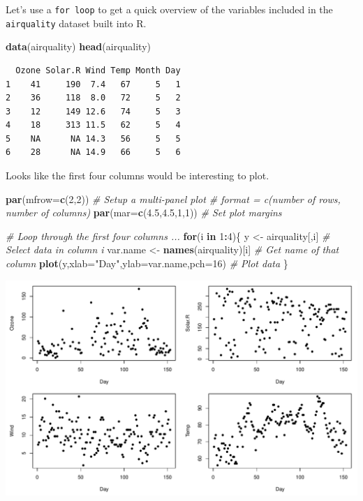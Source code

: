 \documentclass[
]{book}
\newenvironment{Shaded}{\begin{snugshade}}{\end{snugshade}}
\newcommand{\CommentTok}[1]{\textcolor[rgb]{0.56,0.35,0.01}{\textit{#1}}}
\newcommand{\ControlFlowTok}[1]{\textcolor[rgb]{0.13,0.29,0.53}{\textbf{#1}}}
\newcommand{\DataTypeTok}[1]{\textcolor[rgb]{0.13,0.29,0.53}{#1}}
\newcommand{\DecValTok}[1]{\textcolor[rgb]{0.00,0.00,0.81}{#1}}
\newcommand{\FloatTok}[1]{\textcolor[rgb]{0.00,0.00,0.81}{#1}}
\newcommand{\KeywordTok}[1]{\textcolor[rgb]{0.13,0.29,0.53}{\textbf{#1}}}
\newcommand{\NormalTok}[1]{#1}
\newcommand{\OperatorTok}[1]{\textcolor[rgb]{0.81,0.36,0.00}{\textbf{#1}}}
\newcommand{\StringTok}[1]{\textcolor[rgb]{0.31,0.60,0.02}{#1}}
\begin{document}
Let's use a \texttt{for\ loop} to get a quick overview of the variables included in the \texttt{airquality} dataset built into R.

\begin{Shaded}
\begin{Highlighting}[]
\KeywordTok{data}\NormalTok{(airquality)}
\KeywordTok{head}\NormalTok{(airquality)}
\end{Highlighting}
\end{Shaded}

\begin{verbatim}
  Ozone Solar.R Wind Temp Month Day
1    41     190  7.4   67     5   1
2    36     118  8.0   72     5   2
3    12     149 12.6   74     5   3
4    18     313 11.5   62     5   4
5    NA      NA 14.3   56     5   5
6    28      NA 14.9   66     5   6
\end{verbatim}

Looks like the first four columns would be interesting to plot.

\begin{Shaded}
\begin{Highlighting}[]
\KeywordTok{par}\NormalTok{(}\DataTypeTok{mfrow=}\KeywordTok{c}\NormalTok{(}\DecValTok{2}\NormalTok{,}\DecValTok{2}\NormalTok{)) }\CommentTok{# Setup a multi-panel plot # format = c(number of rows, number of columns)}
\KeywordTok{par}\NormalTok{(}\DataTypeTok{mar=}\KeywordTok{c}\NormalTok{(}\FloatTok{4.5}\NormalTok{,}\FloatTok{4.5}\NormalTok{,}\DecValTok{1}\NormalTok{,}\DecValTok{1}\NormalTok{)) }\CommentTok{# Set plot margins}

\CommentTok{# Loop through the first four columns ...}
\ControlFlowTok{for}\NormalTok{(i }\ControlFlowTok{in} \DecValTok{1}\OperatorTok{:}\DecValTok{4}\NormalTok{)\{}
\NormalTok{  y <-}\StringTok{ }\NormalTok{airquality[,i] }\CommentTok{# Select data in column i}
\NormalTok{  var.name <-}\StringTok{ }\KeywordTok{names}\NormalTok{(airquality)[i] }\CommentTok{# Get name of that column}
  \KeywordTok{plot}\NormalTok{(y,}\DataTypeTok{xlab=}\StringTok{"Day"}\NormalTok{,}\DataTypeTok{ylab=}\NormalTok{var.name,}\DataTypeTok{pch=}\DecValTok{16}\NormalTok{) }\CommentTok{# Plot data}
\NormalTok{\}}
\end{Highlighting}
\end{Shaded}

\includegraphics{figures/unnamed-chunk-229-1.pdf}
\end{document}
